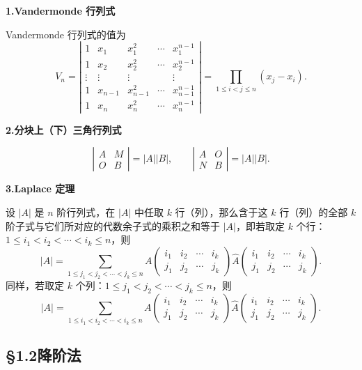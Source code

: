 \documentclass[UTF8,12pt,a4paper,fontset=fandol]{ctexart}
\begin{document}
\noindent\textbf{1.\quad Vandermonde 行列式}

Vandermonde 行列式的值为
\[
V_n=
\left|\begin{array}{ccccc}
1 & x_1 & x_1^2 & \cdots & x_1^{n-1}\\
1 & x_2 & x_2^2 & \cdots & x_2^{n-1}\\
\vdots & \vdots & \vdots &        & \vdots\\
1 & x_{n-1} & x_{n-1}^2 & \cdots & x_{n-1}^{n-1}\\
1 & x_n & x_n^2 & \cdots & x_n^{n-1}
\end{array}\right|
=\prod_{1\le i<j\le n}(x_j-x_i).
\]

\noindent\textbf{2.\quad 分块上（下）三角行列式}

\[
\left|\begin{array}{cc}
A & M\\
O & B
\end{array}\right|=|A||B|,\qquad
\left|\begin{array}{cc}
A & O\\
N & B
\end{array}\right|=|A||B|.
\]

\noindent\textbf{3.\quad Laplace 定理}

设 $|A|$ 是 $n$ 阶行列式，在 $|A|$ 中任取 $k$ 行（列），那么含于这 $k$ 行（列）的全部 $k$ 阶子式与它们所对应的代数余子式的乘积之和等于 $|A|$，即若取定 $k$ 个行：$1\le i_1<i_2<\cdots<i_k\le n$，则
\[
|A|=
\sum_{1\le j_1<j_2<\cdots<j_k\le n}
A\begin{pmatrix}
i_1 & i_2 & \cdots & i_k\\
j_1 & j_2 & \cdots & j_k
\end{pmatrix}
\widehat{A}\begin{pmatrix}
i_1 & i_2 & \cdots & i_k\\
j_1 & j_2 & \cdots & j_k
\end{pmatrix}.
\]
同样，若取定 $k$ 个列：$1\le j_1<j_2<\cdots<j_k\le n$，则
\[
|A|=
\sum_{1\le i_1<i_2<\cdots<i_k\le n}
A\begin{pmatrix}
i_1 & i_2 & \cdots & i_k\\
j_1 & j_2 & \cdots & j_k
\end{pmatrix}
\widehat{A}\begin{pmatrix}
i_1 & i_2 & \cdots & i_k\\
j_1 & j_2 & \cdots & j_k
\end{pmatrix}.
\]

\subsection*{§1.2\quad 降阶法}
\end{document}
